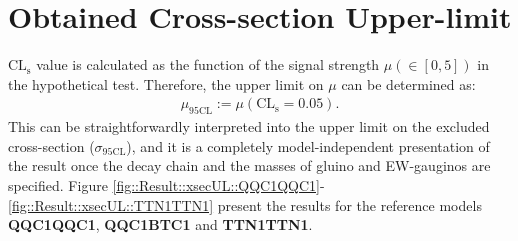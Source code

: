 \clearpage
\section{Obtained Cross-section Upper-limit}
$\mathrm{CL_s}$ value is calculated as the function of the signal strength $\mu (\in [0,5])$ in the hypothetical test. Therefore, the upper limit on $\mu$ can be determined as:
\begin{align}
\mu_{95\mathrm{CL}} := \mu(\mathrm{CL_s}=0.05).
\end{align}
This can be straightforwardly interpreted into the upper limit on the excluded cross-section ($\sigma_{95\mathrm{CL}}$), and it is a completely model-independent presentation of the result once the decay chain and the masses of gluino and EW-gauginos are specified.
Figure \ref{fig::Result::xsecUL::QQC1QQC1}-\ref{fig::Result::xsecUL::TTN1TTN1} present the results for the reference models \textbf{QQC1QQC1}, \textbf{QQC1BTC1} and \textbf{TTN1TTN1}. \\


